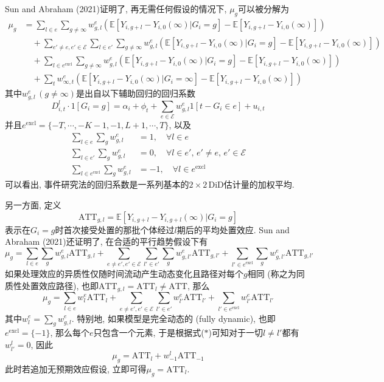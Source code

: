 \documentclass[cn,sakura,14pt,screen,bibstyle=gb7714-2015,math=mtpro2]{elegantnote}
\newcommand{\E}{\mathbb{E}}
\begin{document}
Sun and Abraham (2021)证明了, 再无需任何假设的情况下, $\mu_g$可以被分解为
\begin{align*}
\mu_g&=\sum_{l\in e}\sum_{g\neq\infty}w_{g,l}^e(\E[Y_{i,g+l}-Y_{i,0}(\infty)|G_i=g]-\E[Y_{i,g+l}-Y_{i,0}(\infty)]) \\
&\quad+\sum_{e'\neq e,e'\in\mathcal{E}}\sum_{l\in e'}\sum_{g\ne\infty}w_{g,l}^e(\E[Y_{i,g+l}-Y_{i,0}(\infty)|G_i=g]-\E[Y_{i,g+l}-Y_{i,0}(\infty)]) \\
&\quad +\sum_{l\in e^\text{excl}}\sum_{g\ne\infty}w_{g,l}^e(\E[Y_{i,g+l}-Y_{i,0}(\infty)|G_i=g]-\E[Y_{i,g+l}-Y_{i,0}(\infty)]) \\
&\quad+ \sum_tw_{\infty,t}^e(\E[Y_{i,g+l}-Y_{i,0}(\infty)|G_i=\infty]-\E[Y_{i,g+l}-Y_{i,0}(\infty)])
\end{align*}
其中$w_{g,l}^e\,(g\neq\infty)$是出自以下辅助回归的回归系数
$$D_{i,t}^l\cdot1[G_i=g]=\alpha_i+\phi_t+\sum_{e\in\mathcal{E}}w_{g,l}^e1[t-G_i\in e]+u_{i,t}$$
并且$e^\text{excl}=\{-T,\cdots,-K-1,-1,L+1,\cdots,T\}$, 以及
\begin{align}
\sum_{l\in e}\sum_gw_{g,l}^e&=1,\quad\forall l\in e \nonumber \\
\sum_{l\in e'}\sum_gw_{g,l}^e&=0,\quad \forall l\in e',\, e'\neq e,\, e'\in\mathcal{E} \tag{$\ast$} \\
\sum_{l\in e^\text{excl}}\sum_gw_{g,l}^e&=-1,\quad\forall l\in e^\text{excl} \nonumber
\end{align}
可以看出, 事件研究法的回归系数是一系列基本的$2\times 2\,$DiD估计量的加权平均.

另一方面, 定义
$$\text{ATT}_{g,l}=\E[Y_{i,g+l}-Y_{i,g+l}(\infty)|G_i=g]$$
表示在$G_i=g$时首次接受处置的那批个体经过$l$期后的平均处置效应. Sun and Abraham (2021)还证明了, 在合适的平行趋势假设下有
$$\mu_g=\sum_{l\in e}\sum_gw_{g,l}^e\text{ATT}_{g,l}+\sum_{e\neq e',e'\in\mathcal{E}}\sum_{l'\in e'}\sum_g w_{g,l'}^e\text{ATT}_{g,l'}+\sum_{l'\in e^\text{excl}}\sum_gw_{g,l'}^e\text{ATT}_{g,l'}$$
如果处理效应的异质性仅随时间流动产生动态变化且路径对每个$g$相同 (称之为同质性处置效应路径), 也即$\text{ATT}_{g,l}=\text{ATT}_l\neq \text{ATT}$, 那么
$$\mu_g=\sum_{l\in e}w_{l}^e\text{ATT}_l+\sum_{e\neq e',e'\in\mathcal{E}}\sum_{l'\in e'} w_{l'}^e\text{ATT}_{l'}+\sum_{l'\in e^\text{excl}}w_{l'}^e\text{ATT}_{l'}$$
其中$w_l^e=\sum_gw_{g,l}^e$. 特别地, 如果模型是完全动态的 (fully dynamic), 也即$e^\text{excl}=\{-1\}$, 那么每个$e$只包含一个元素, 于是根据式($\ast$)可知对于一切$l\neq l'$都有$w_{l'}^l=0$, 因此
$$\mu_g=\text{ATT}_l+w_{-1}^l\text{ATT}_{-1}$$
此时若追加无预期效应假设, 立即可得$\mu_g=\text{ATT}_l$.
\end{document}
